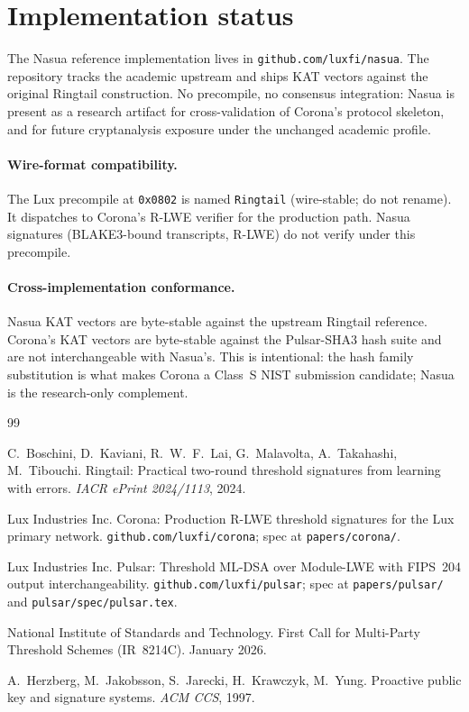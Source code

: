 \documentclass[11pt,a4paper]{article}
\theoremstyle{definition}
\theoremstyle{remark}
\begin{document}
\section{Implementation status}
\label{sec:status}

The Nasua reference implementation lives in
\texttt{github.com/luxfi/nasua}. The repository tracks the academic
upstream and ships KAT vectors against the original Ringtail
construction. No precompile, no consensus integration: Nasua is
present as a research artifact for cross-validation of Corona's
protocol skeleton, and for future cryptanalysis exposure under the
unchanged academic profile.

\paragraph{Wire-format compatibility.} The Lux precompile at
\texttt{0x0802} is named \texttt{Ringtail} (wire-stable; do not
rename). It dispatches to Corona's R-LWE verifier for the production
path. Nasua signatures (BLAKE3-bound transcripts, R-LWE) do not
verify under this precompile.

\paragraph{Cross-implementation conformance.} Nasua KAT vectors
are byte-stable against the upstream Ringtail reference. Corona's
KAT vectors are byte-stable against the Pulsar-SHA3 hash suite and
are not interchangeable with Nasua's. This is intentional: the
hash family substitution is what makes Corona a Class~S NIST
submission candidate; Nasua is the research-only complement.

\begin{thebibliography}{99}

C.~Boschini, D.~Kaviani, R.~W.~F.~Lai, G.~Malavolta, A.~Takahashi,
M.~Tibouchi.
\newblock Ringtail: Practical two-round threshold signatures from
learning with errors.
\newblock \emph{IACR ePrint 2024/1113}, 2024.

Lux Industries Inc.
\newblock Corona: Production R-LWE threshold signatures for the Lux
primary network.
\newblock \texttt{github.com/luxfi/corona}; spec at
\texttt{papers/corona/}.

Lux Industries Inc.
\newblock Pulsar: Threshold ML-DSA over Module-LWE with FIPS~204
output interchangeability.
\newblock \texttt{github.com/luxfi/pulsar}; spec at
\texttt{papers/pulsar/} and \texttt{pulsar/spec/pulsar.tex}.

National Institute of Standards and Technology.
\newblock First Call for Multi-Party Threshold Schemes
(IR~8214C).
\newblock January 2026.

A.~Herzberg, M.~Jakobsson, S.~Jarecki, H.~Krawczyk, M.~Yung.
\newblock Proactive public key and signature systems.
\newblock \emph{ACM CCS}, 1997.

\end{thebibliography}
\end{document}
